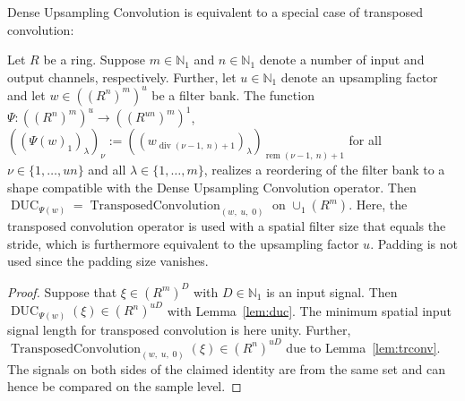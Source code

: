 \documentclass[journal]{IEEEtran}
\newcommand{\N}{\mathbb{N}}
\newcommand{\discint}[2]{\{#1,\dotsc,#2\}}
\newcommand{\inint}[2]{\in\discint{#1}{#2}}
\renewcommand{\div}[2]{\operatorname{div}(#1,\ #2)}
\newcommand{\rem}[2]{\operatorname{rem}(#1,\ #2)}
\DeclareMathOperator{\TransposedConvolution}{TransposedConvolution}
\DeclareMathOperator{\DUC}{DUC}
\begin{document}
Dense Upsampling Convolution is equivalent to a special case of transposed convolution:
\begin{theorem}
\label{thm:duc_trconv}
Let $R$ be a ring.
Suppose $m\in\N_1$ and $n\in\N_1$ denote a number of input and output channels, respectively.
Further, let $u\in\N_1$ denote an upsampling factor and let $w\in((R^n)^m)^u$ be a filter bank.
The function $\Psi\colon((R^n)^m)^u\to ((R^{un})^m)^1$, $((\Psi(w)_1)_\lambda)_\nu := ((w_{\div{\nu - 1}{n} + 1})_\lambda)_{\rem{\nu - 1}{n} + 1}$ for all $\nu\inint{1}{un}$ and all $\lambda\inint{1}{m}$, realizes a reordering of the filter bank to a shape compatible with the Dense Upsampling Convolution operator.
Then $\DUC_{\Psi(w)} = \TransposedConvolution_{(w,\; u,\; 0)}$ on $\cup_1(R^m)$.
Here, the transposed convolution operator is used with a spatial filter size that equals the stride, which is furthermore equivalent to the upsampling factor $u$.
Padding is not used since the padding size vanishes.
\end{theorem}\begin{proof}
Suppose that $\xi\in(R^m)^D$ with $D\in\N_1$ is an input signal.
Then $\DUC_{\Psi(w)}(\xi)\in(R^n)^{uD}$ with Lemma~\ref{lem:duc}.
The minimum spatial input signal length for transposed convolution is here unity.
Further, $\TransposedConvolution_{(w,\; u,\; 0)}(\xi)\in(R^n)^{uD}$ due to Lemma~\ref{lem:trconv}.
The signals on both sides of the claimed identity are from the same set and can hence be compared on the sample level.


\end{proof}
\end{document}
